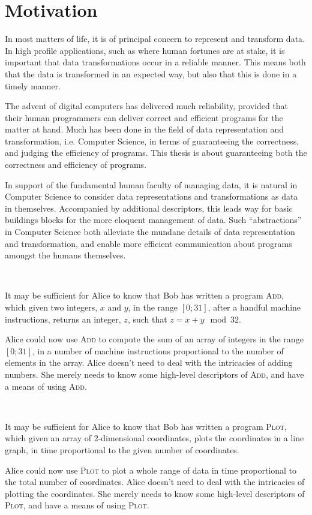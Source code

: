 \section{Motivation}

In most matters of life, it is of principal concern to represent and transform
data. In high profile applications, such as where human fortunes are at stake,
it is important that data transformations occur in a reliable manner.  This
means both that the data is transformed in an expected way, but also that this
is done in a timely manner.

The advent of digital computers has delivered much reliability, provided that
their human programmers can deliver correct and efficient programs for the
matter at hand. Much has been done in the field of data representation and
transformation, i.e. Computer Science, in terms of guaranteeing the
correctness, and judging the efficiency of programs. This thesis is about
guaranteeing both the correctness and efficiency of programs.

In support of the fundamental human faculty of managing data, it is natural in
Computer Science to consider data representations and transformations as data
in themselves. Accompanied by additional descriptors, this leads way for basic
buildings blocks for the more eloquent management of data. Such
``abstractions'' in Computer Science both alleviate the mundane details of data
representation and transformation, and enable more efficient communication
about programs amongst the humans themselves.

\begin{example} \label{example:alice-bob-add} \ 

It may be sufficient for Alice to know that Bob has written a program
\textsc{Add}, which given two integers, $x$ and $y$, in the range $[0;31]$,
after a handful machine instructions, returns an integer, $z$, such that $z=x+y
\mod 32$.

Alice could now use \textsc{Add} to compute the sum of an array of integers in
the range $[0;31]$, in a number of machine instructions proportional to the
number of elements in the array. Alice doesn't need to deal with the
intricacies of adding numbers. She merely needs to know some high-level
descriptors of \textsc{Add}, and have a means of using \textsc{Add}.

\end{example}

\begin{example} \label{example:alice-bob-plot} \

It may be sufficient for Alice to know that Bob has written a program
\textsc{Plot}, which given an array of 2-dimensional coordinates, plots the
coordinates in a line graph, in time proportional to the given number of
coordinates.

Alice could now use \textsc{Plot} to plot a whole range of data in time
proportional to the total number of coordinates. Alice doesn't need to deal
with the intricacies of plotting the coordinates. She merely needs to know some
high-level descriptors of \textsc{Plot}, and have a means of using
\textsc{Plot}.

\end{example}

